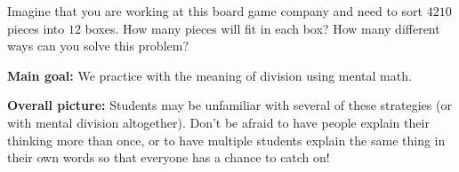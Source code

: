 \documentclass[nooutcomes,noauthor, handout]{ximera}
\begin{document}
\begin{problem}
Imagine that you are working at this board game company and need to sort $4210$ pieces into $12$ boxes. How many pieces will fit in each box? How many different ways can you solve this problem?
\end{problem}








\newpage

\begin{instructorNotes} 



{\bf Main goal:} We practice with the meaning of division using mental math.


{\bf Overall picture:} Students may be unfamiliar with several of these strategies (or with mental division altogether). Don't be afraid to have people explain their thinking more than once, or to have multiple students explain the same thing in their own words so that everyone has a chance to catch on!


\end{instructorNotes}
\end{document}
